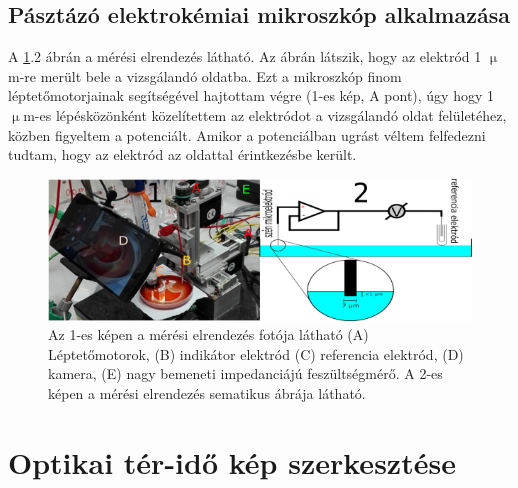\subsection{Pásztázó elektrokémiai mikroszkóp alkalmazása}
A \ref{fig:secm}.2 ábrán a mérési elrendezés látható. Az ábrán látszik, hogy az elektród 1 $\upmu$m-re merült bele a vizsgálandó oldatba. Ezt a mikroszkóp finom léptetőmotorjainak segítségével hajtottam végre (1-es kép, A pont), úgy hogy 1 $\upmu$m-es lépésközönként közelítettem az elektródot a vizsgálandó oldat felületéhez, közben figyeltem a potenciált. Amikor a potenciálban ugrást véltem felfedezni tudtam, hogy az elektród az oldattal érintkezésbe került.
\begin{figure}[!h]
\centering
\includegraphics[width=1\textwidth]{img/secm.png}
\caption{Az 1-es képen a mérési elrendezés fotója látható (A) Léptetőmotorok, (B) indikátor elektród (C) referencia elektród, (D) kamera, (E) nagy bemeneti impedanciájú feszültségmérő. A 2-es képen a mérési elrendezés sematikus ábrája látható.}
\label{fig:secm}
\end{figure}
\section{Optikai tér-idő kép szerkesztése}

